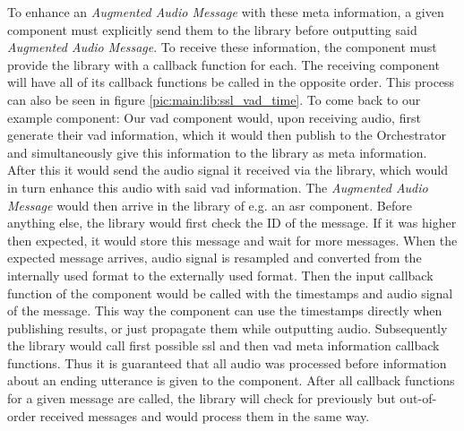 To enhance an \textit{Augmented Audio Message} with these meta information, a given component must explicitly send them to the library before outputting said \textit{Augmented Audio Message}.
To receive these information, the component must provide the library with a callback function for each.
The receiving component will have all of its callback functions be called in the opposite order.
This process can also be seen in figure \ref{pic:main:lib:ssl_vad_time}.
To come back to our example component:
Our \gls{vad} component would, upon receiving audio, first generate their \gls{vad} information, which it would then publish to the Orchestrator and simultaneously give this information to the library as meta information.
After this it would send the audio signal it received via the library, which would in turn enhance this audio with said \gls{vad} information.
The \textit{Augmented Audio Message} would then arrive in the library of e.g. an \gls{asr} component.
Before anything else, the library would first check the ID of the message.
If it was higher then expected, it would store this message and wait for more messages.
When the expected message arrives, audio signal is resampled and converted from the internally used format to the externally used format.
Then the input callback function of the component would be called with the timestamps and audio signal of the message.
This way the component can use the timestamps directly when publishing results, or just propagate them while outputting audio.
Subsequently the library would call first possible \gls{ssl} and then \gls{vad} meta information callback functions.
Thus it is guaranteed that all audio was processed before information about an ending utterance is given to the component. 
After all callback functions for a given message are called, the library will check for previously but out-of-order received messages and would process them in the same way.




